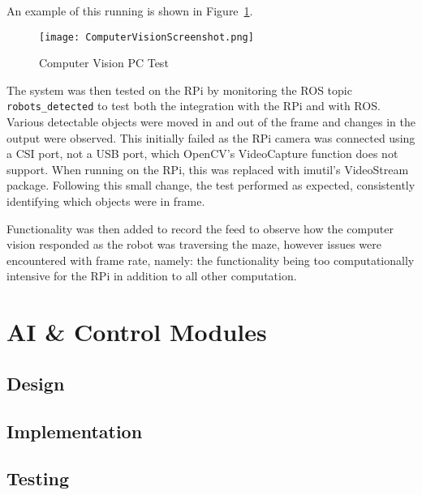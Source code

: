 An example of this running is shown in Figure~\ref{fig:cv_screenshot}.

\begin{figure}[!ht]
	\centering
	\texttt{[image: ComputerVisionScreenshot.png]}
	\caption{Computer Vision PC Test}\label{fig:cv_screenshot}

\end{figure}

The system was then tested on the RPi by monitoring the ROS topic \verb|robots_detected| to
test both the integration with the RPi and with ROS. Various detectable objects were moved in
and out of the frame and changes in the output were observed. This initially failed as the RPi
camera was connected using a CSI port, not a USB port, which OpenCV's VideoCapture function
does not support. When running on the RPi, this was replaced with imutil's VideoStream package.
Following this small change, the test performed as expected, consistently identifying which objects were in
frame.

Functionality was then added to record the feed to observe how the computer vision responded as
the robot was traversing the maze, however issues were encountered with frame rate, namely: the functionality being too
computationally intensive for the RPi in addition to all other computation.


\section{AI \& Control Modules}\label{soft/ai}

\subsection{Design}\label{soft/ai/design}

\subsection{Implementation}\label{soft/ai/impl}

\subsection{Testing}\label{soft/ai/test}
